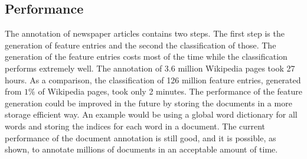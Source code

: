 \subsection*{Performance}
The annotation of newspaper articles contains two steps. The first step is the generation of feature entries and the second the classification of those. The generation of the feature entries costs most of the time while the classification performs extremely well. The annotation of 3.6 million Wikipedia pages took 27 hours. As a comparison, the classification of 126 million feature entries, generated from $1\%$ of Wikipedia pages, took only 2 minutes. The performance of the feature generation could be improved in the future by storing the documents in a more storage efficient way. An example would be using a global word dictionary for all words and storing the indices for each word in a document. The current performance of the document annotation is still good, and it is possible, as shown, to annotate millions of documents in an acceptable amount of time.\par
